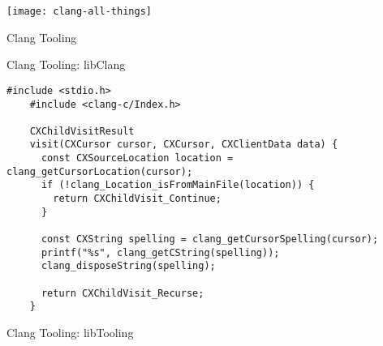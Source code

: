 
\begin{slide}{}
  \texttt{[image: clang-all-things]}
\end{slide}

\begin{slide}{Clang Tooling}\end{slide}

\begin{frame}[fragile]{Clang Tooling: libClang}
  \begin{lstlisting}[basicstyle=\ttfamily\scriptsize]
    #include <stdio.h>
    #include <clang-c/Index.h>

    CXChildVisitResult
    visit(CXCursor cursor, CXCursor, CXClientData data) {
      const CXSourceLocation location = clang_getCursorLocation(cursor);
      if (!clang_Location_isFromMainFile(location)) {
        return CXChildVisit_Continue;
      }

      const CXString spelling = clang_getCursorSpelling(cursor);
      printf("%s", clang_getCString(spelling));
      clang_disposeString(spelling);

      return CXChildVisit_Recurse;
    }
  \end{lstlisting}
\end{frame}


\begin{slide}{Clang Tooling: libTooling}
  \vspace{0.2cm}


  \vspace{0.9cm}


  \vspace{0.2cm}


  \vspace{0.7cm}

  \vspace{0.2cm}

\end{slide}

